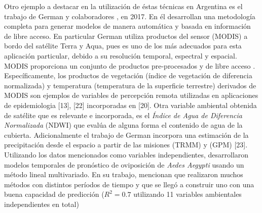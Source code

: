 \par Otro ejemplo a destacar en la utilización de éstas técnicas en Argentina es
  el trabajo de German y colaboradores \cite{german_temporal}, en 2017.
  En él desarrollan una metodología completa
  para generar modelos de manera automática y basada en información de libre
  acceso. En particular German \cite{german_temporal} utiliza productos del sensor (MODIS) a bordo
  del satélite Terra y Aqua, pues es uno de los más adecuados para esta
  aplicación particular, debido a su resolución temporal, espectral y espacial.
  MODIS proporciona un conjunto de productos pre-procesados y de libre acceso \cite{terra_aqua_modis}.
  Específicamente, los productos de vegetación (índice de vegetación de diferencia
  normalizada) y temperatura (temperatura de la superficie terrestre) derivados
  de MODIS son ejemplos de variables de percepción remota utilizadas
  en aplicaciones de epidemiologia [13], [22] incorporadas en [20]. Otra variable
  ambiental obtenida de satélite que es relevante e incorporada, es el
  \textit{Índice de Agua de Diferencia Normalizada} (NDWI) que evalúa de alguna
  forma el contenido de agua de la cubierta. Adicionalmente el trabajo de German
  incorpora una estimación de la precipitación desde el espacio a partir de las
  misiones (TRMM) y (GPM) [23].
  Utilizando los datos mencionados como variables independientes,
  desarrollaron modelos temporales de pronóstico de oviposición de \textit{Aedes Aegypti}
  usando un método lineal multivariado. En su trabajo, mencionan que
  realizaron muchos métodos con distintos períodos de tiempo y que se llegó a
  construir uno con una buena capacidad de
  predicción ($R^{2} = 0.7 $ utilizando 11 variables ambientales independientes en total)


